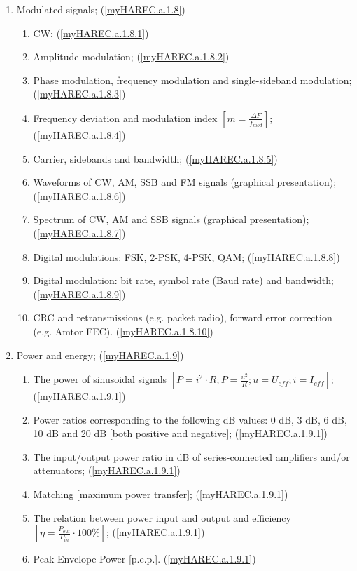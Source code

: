 \begin{enumerate}
\begin{enumerate}[noitemsep]
\item Modulated signals; (\ref{myHAREC.a.1.8})\label{HAREC.a.1.8}
\begin{enumerate}[noitemsep]
\item CW; (\ref{myHAREC.a.1.8.1})\label{HAREC.a.1.8.1}
\item Amplitude modulation; (\ref{myHAREC.a.1.8.2})\label{HAREC.a.1.8.2}
\item Phase modulation, frequency modulation and single-sideband modulation; (\ref{myHAREC.a.1.8.3})\label{HAREC.a.1.8.3}
\item Frequency deviation and modulation index $\left[m = \frac{\Delta F}{f_{mod}}\right]$; (\ref{myHAREC.a.1.8.4})\label{HAREC.a.1.8.4}
\item Carrier, sidebands and bandwidth; (\ref{myHAREC.a.1.8.5})\label{HAREC.a.1.8.5}
\item Waveforms of CW, AM, SSB and FM signals (graphical presentation); (\ref{myHAREC.a.1.8.6})\label{HAREC.a.1.8.6}
\item Spectrum of CW, AM and SSB signals (graphical presentation); (\ref{myHAREC.a.1.8.7})\label{HAREC.a.1.8.7}
\item Digital modulations: FSK, 2-PSK, 4-PSK, QAM; (\ref{myHAREC.a.1.8.8})\label{HAREC.a.1.8.8}
\item Digital modulation: bit rate, symbol rate (Baud rate) and bandwidth; (\ref{myHAREC.a.1.8.9})\label{HAREC.a.1.8.9}
\item CRC and retransmissions (e.g. packet radio), forward error correction (e.g. Amtor FEC). (\ref{myHAREC.a.1.8.10})\label{HAREC.a.1.8.10}
\end{enumerate}

\item Power and energy; (\ref{myHAREC.a.1.9})\label{HAREC.a.1.9}
\begin{enumerate}[noitemsep]
\item The power of sinusoidal signals $\left[P=i^2 \cdot R; P=\frac{u^2}{R}; u=U_{eff}; i=I_{eff}\right]$; (\ref{myHAREC.a.1.9.1})\label{HAREC.a.1.9.1}
\item Power ratios corresponding to the following dB values: 0 dB, 3 dB, 6 dB, 10 dB and 20 dB [both positive and negative]; (\ref{myHAREC.a.1.9.1})\label{HAREC.a.1.9.1}
\item The input/output power ratio in dB of series-connected amplifiers and/or attenuators; (\ref{myHAREC.a.1.9.1})\label{HAREC.a.1.9.1}
\item Matching [maximum power transfer]; (\ref{myHAREC.a.1.9.1})\label{HAREC.a.1.9.1}
\item The relation between power input and output and efficiency $\left[\eta=\frac{P_{out}}{P_{in}}\cdot 100\%\right]$; (\ref{myHAREC.a.1.9.1})\label{HAREC.a.1.9.1}
\item Peak Envelope Power [p.e.p.]. (\ref{myHAREC.a.1.9.1})\label{HAREC.a.1.9.1}
\end{enumerate}


\end{enumerate}
\end{enumerate}
